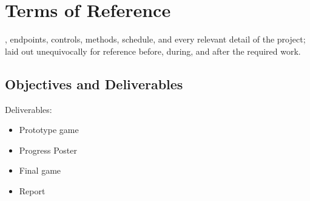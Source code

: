 \chapter[Terms of Reference]{Terms of Reference}
\label{ch:reference}


, endpoints, controls, methods, schedule, and every relevant detail of the project; laid out unequivocally for reference before, during, and after the required work.

\section{Objectives and Deliverables}

Deliverables:

\begin{itemize}\itemsep-3pt
	\item Prototype game
	\item Progress Poster
	\item Final game
	\item Report
\end{itemize}









